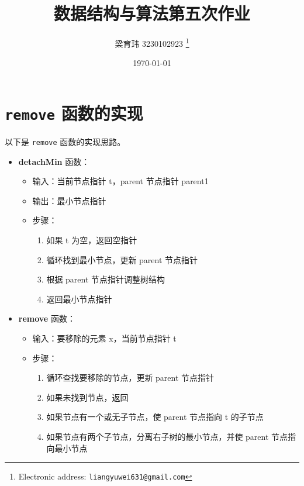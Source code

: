 \documentclass[UTF8]{ctexart}
\begin{document}
\pagestyle{fancy}
\fancyhead{}
\rhead{\today}
\title{数据结构与算法第五次作业}

\author{梁育玮 3230102923
  \thanks{Electronic address: \texttt{liangyuwei631@gmail.com}}}


\date{\today}

\maketitle
\begin{abstract}
\end{abstract}

\section{\texttt{remove} 函数的实现}

以下是 \texttt{remove} 函数的实现思路。
\begin{itemize}
    \item \textbf{detachMin} 函数：
    \begin{itemize}
        \item 输入：当前节点指针 t，parent 节点指针 parent1
        \item 输出：最小节点指针
        \item 步骤：
        \begin{enumerate}
            \item 如果 t 为空，返回空指针
            \item 循环找到最小节点，更新 parent 节点指针
            \item 根据 parent 节点指针调整树结构
            \item 返回最小节点指针
        \end{enumerate}
    \end{itemize}
    \item \textbf{remove} 函数：
    \begin{itemize}
        \item 输入：要移除的元素 x，当前节点指针 t
        \item 步骤：
        \begin{enumerate}
            \item 循环查找要移除的节点，更新 parent 节点指针
            \item 如果未找到节点，返回
            \item 如果节点有一个或无子节点，使 parent 节点指向 t 的子节点 
            \item 如果节点有两个子节点，分离右子树的最小节点，并使 parent 节点指向最小节点
        \end{enumerate}
    \end{itemize}
\end{itemize}
\end{document}
